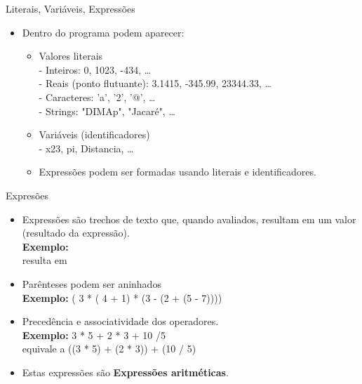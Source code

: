 \documentclass[handout,t]{beamer}
\begin{document}
\begin{frame}{Literais, Variáveis, Expressões}
\begin{itemize}
    \item Dentro do programa podem aparecer:
    \begin{itemize}
        \item Valores literais\\
        \qquad- Inteiros: 0, 1023, -434, \dots\\
        \qquad- Reais (ponto flutuante): 3.1415, -345.99, 23344.33, \dots\\
        \qquad- Caracteres: 'a', '2', '@', \dots \\
        \qquad- Strings: "DIMAp", "Jacaré", \dots
        \item Variáveis (identificadores)\\
        \qquad- x23, pi, Distancia, \dots
        \item Expressões podem ser formadas usando literais e identificadores.
    \end{itemize}
\end{itemize}
\end{frame}

\begin{frame}{Expresões}
\begin{itemize}
    \item Expressões são trechos de texto que, quando avaliados, resultam em um valor (resultado da expressão).\\[3mm]
    
    \textbf{Exemplo:} 
     \\[2mm]
    \qquad resulta em 
    
    \item Parênteses podem ser aninhados\\[2mm]
    \textbf{Exemplo:} ( 3 * ( 4 + 1) * (3 - (2 + (5 - 7))))
    
    \item Precedência e associatividade dos operadores.\\[2mm]
    \textbf{Exemplo:} 3 * 5 + 2 * 3 + 10 /5\\[2mm]
    \qquad equivale a ((3 * 5) + (2 * 3)) + (10 / 5)
    \item Estas expressões são  \textbf{Expressões aritméticas}.
\end{itemize}
\end{frame}
\end{document}
